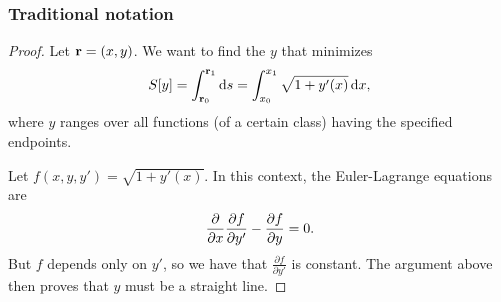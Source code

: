 \subsubsection{Traditional notation}
\begin{proof}
  Let $\mathbf{r} = (x, y)$. We want to find the $y$ that minimizes
\begin{align*}
  S[y] = \int_{\r_0}^{\r_1}\ds = \int_{x_0}^{x_1}\sqrt{1 + y'(x)} \dx,
\end{align*}
where $y$ ranges over all functions (of a certain class) having the specified endpoints.

Let $f(x, y, y') = \sqrt{1 + y'(x)}$. In this context, the Euler-Lagrange equations are
\begin{align*}
  \frac{\partial}{\partial x} \frac{\partial f}{\partial y'} - \frac{\partial f}{\partial y} = 0.
\end{align*}
But $f$ depends only on $y'$, so we have that $\frac{\partial f}{\partial y'} $ is constant. The argument above
then proves that $y$ must be a straight line.
\end{proof}


